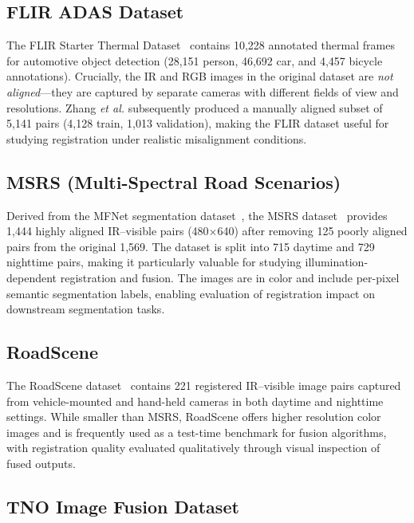 \subsection{FLIR ADAS Dataset}
\label{subsec:flir}

The FLIR Starter Thermal Dataset~\cite{flir2018} contains 10,228 annotated
thermal frames for automotive object detection (28,151 person, 46,692 car, and
4,457 bicycle annotations). Crucially, the IR and RGB images in the original
dataset are \emph{not aligned}---they are captured by separate cameras with
different fields of view and resolutions. Zhang \textit{et al.} subsequently
produced a manually aligned subset of 5,141 pairs (4,128 train, 1,013
validation), making the FLIR dataset useful for studying registration under
realistic misalignment conditions.

\subsection{MSRS (Multi-Spectral Road Scenarios)}
\label{subsec:msrs}

Derived from the MFNet segmentation dataset~\cite{ha2017mfnet}, the MSRS
dataset~\cite{tang2022piafusion} provides 1,444 highly aligned IR--visible
pairs (480$\times$640) after removing 125 poorly aligned pairs from the
original 1,569. The dataset is split into 715 daytime and 729 nighttime pairs,
making it particularly valuable for studying illumination-dependent
registration and fusion. The images are in color and include per-pixel semantic
segmentation labels, enabling evaluation of registration impact on downstream
segmentation tasks.

\subsection{RoadScene}
\label{subsec:roadscene}

The RoadScene dataset~\cite{xu2020u2fusion} contains 221 registered
IR--visible image pairs captured from vehicle-mounted and hand-held cameras in
both daytime and nighttime settings. While smaller than MSRS, RoadScene offers
higher resolution color images and is frequently used as a test-time benchmark
for fusion algorithms, with registration quality evaluated qualitatively through
visual inspection of fused outputs.

\subsection{TNO Image Fusion Dataset}
\label{subsec:tno}

